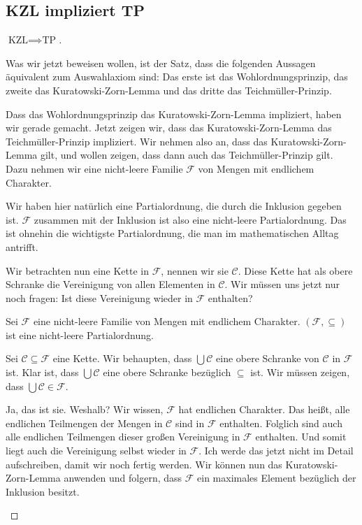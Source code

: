 \subsection{KZL impliziert TP}

\begin{proof}[$\text{KZL} \implies \text{TP}$]
\begin{spoken-clean}[01:00:30 - 01:03:00]
Was wir jetzt beweisen wollen, ist der Satz, dass die folgenden Aussagen äquivalent zum Auswahlaxiom sind: Das erste ist das Wohlordnungsprinzip, das zweite das Kuratowski-Zorn-Lemma und das dritte das Teichmüller-Prinzip. 

Dass das Wohlordnungsprinzip das Kuratowski-Zorn-Lemma impliziert, haben wir gerade gemacht. Jetzt zeigen wir, dass das Kuratowski-Zorn-Lemma das Teichmüller-Prinzip impliziert. Wir nehmen also an, dass das Kuratowski-Zorn-Lemma gilt, und wollen zeigen, dass dann auch das Teichmüller-Prinzip gilt. Dazu nehmen wir eine nicht-leere Familie $\mathcal{F}$ von Mengen mit endlichem Charakter.

Wir haben hier natürlich eine Partialordnung, die durch die Inklusion gegeben ist. $\mathcal{F}$ zusammen mit der Inklusion ist also eine nicht-leere Partialordnung. Das ist ohnehin die wichtigste Partialordnung, die man im mathematischen Alltag antrifft.

Wir betrachten nun eine Kette in $\mathcal{F}$, nennen wir sie $\mathcal{C}$. Diese Kette hat als obere Schranke die Vereinigung von allen Elementen in $\mathcal{C}$. Wir müssen uns jetzt nur noch fragen: Ist diese Vereinigung wieder in $\mathcal{F}$ enthalten?
\end{spoken-clean}

\begin{math-stroke}
Sei $\mathcal{F}$ eine nicht-leere Familie von Mengen mit endlichem Charakter.
$(\mathcal{F}, \subseteq)$ ist eine nicht-leere Partialordnung.

Sei $\mathcal{C} \subseteq \mathcal{F}$ eine Kette.
Wir behaupten, dass $\bigcup \mathcal{C}$ eine obere Schranke von $\mathcal{C}$ in $\mathcal{F}$ ist.
Klar ist, dass $\bigcup \mathcal{C}$ eine obere Schranke bezüglich $\subseteq$ ist. Wir müssen zeigen, dass $\bigcup \mathcal{C} \in \mathcal{F}$.
\end{math-stroke}

\begin{spoken-clean}[01:03:00 - 01:05:00]
Ja, das ist sie. Weshalb? Wir wissen, $\mathcal{F}$ hat endlichen Charakter. Das heißt, alle endlichen Teilmengen der Mengen in $\mathcal{C}$ sind in $\mathcal{F}$ enthalten. Folglich sind auch alle endlichen Teilmengen dieser großen Vereinigung in $\mathcal{F}$ enthalten. Und somit liegt auch die Vereinigung selbst wieder in $\mathcal{F}$. Ich werde das jetzt nicht im Detail aufschreiben, damit wir noch fertig werden. Wir können nun das Kuratowski-Zorn-Lemma anwenden und folgern, dass $\mathcal{F}$ ein maximales Element bezüglich der Inklusion besitzt.
\end{spoken-clean}


\end{proof}
